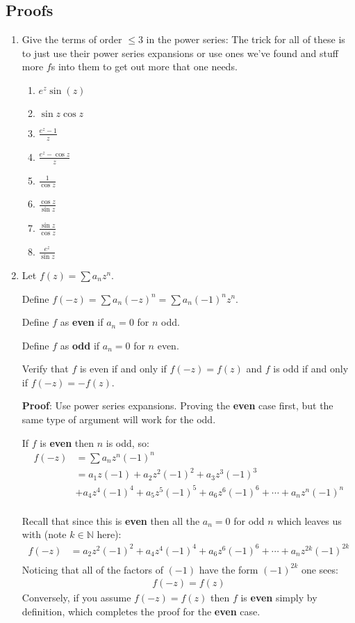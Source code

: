 \subsection{Proofs}
\begin{enumerate}

    \item Give the terms of order $\leq 3$ in the power series:
    The trick for all of these is to just use their power series expansions or use ones we've found and stuff more $f$s into them 
    to get out more that one needs.
    \begin{enumerate}
      \item $e^z \sin(z)$
      \item $\sin z \cos z$
      \item $\frac{e^z - 1}{z}$
      \item $\frac{e^z - \cos z}{z}$
      \item $\frac{1}{\cos z}$
      \item $\frac{\cos z}{\sin z}$
      \item $\frac{\sin z}{\cos z}$
      \item $\frac{e^z}{\sin z}$
    \end{enumerate}
    
    \item Let $f(z) = \sum a_n z^n$.
  
    Define $f(-z) = \sum a_n (-z)^n = \sum a_n(-1)^n z^n$.
  
    Define $f$ as \textbf{even} if $a_n = 0$ for $n$ odd.
  
    Define $f$ as \textbf{odd} if $a_n = 0$ for $n$ even.
  
    Verify that $f$ is even if and only if $f(-z) = f(z)$ and $f$ is odd if and only if $f(-z) = -f(z).$
  
    \textbf{Proof}:
    Use power series expansions. Proving the \textbf{even} case first, but the same type of argument will work for the odd.
  
    If $f$ is \textbf{even} then $n$ is odd, so:
    \begin{align*}
      f(-z) &= \sum a_n z^n (-1)^n \\
      &= a_1 z (-1) + a_2 z^2 (-1)^2 + a_3 z^3 (-1)^3 \\
      &+ a_4 z^4 (-1)^4 + a_5 z^5 (-1)^5 + a_6 z^6 (-1)^6 + \cdots + a_n z^n (-1)^n \\
    \end{align*}
  
    Recall that since this is \textbf{even} then all the $a_n = 0$ for odd $n$ which leaves us 
    with (note $k \in \mathbb{N}$ here):
    \begin{align*}
      f(-z) &= a_2 z^2 (-1)^2 + a_4 z^4 (-1)^4 + a_6 z^6 (-1)^6 + \cdots + a_n z^{2k} (-1)^{2k} \\
    \end{align*} 
    Noticing that all of the factors of $(-1)$ have the form $(-1)^{2k}$ one sees:
    \begin{align*}
      f(-z) = f(z)
    \end{align*}
    Conversely, if you assume $f(-z) = f(z)$ then $f$ is \textbf{even} simply by definition, 
    which completes the proof for the \textbf{even} case. 
    

\end{enumerate}
